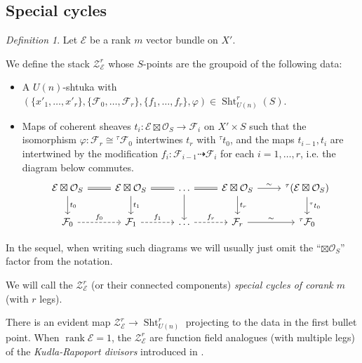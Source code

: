 \documentclass[reqno]{amsart}
\numberwithin{equation}{section}
\newcommand{\Cal}[1]{\mathcal{#1}}
\newcommand{\ft}{{}^{\tau}}
\newcommand{\co}{\colon}
\DeclareMathOperator{\rank}{rank}
\DeclareMathOperator{\Sht}{Sht}
\newcommand\cO{\mathcal{O}}
\theoremstyle{remark}
\newtheorem{defn}[thm]{Definition}
\numberwithin{equation}{section}
\begin{document}
\subsection{Special cycles}

\begin{defn}\label{def: Z} Let $\Cal{E}$ be a rank $m$ vector bundle on $X'$.

 We define the stack $\Cal{Z}_{\Cal{E}}^{r}$ whose $S$-points are the groupoid of the following data: 
 \begin{itemize}
 \item A $U(n)$-shtuka with $(\{x'_1, \ldots, x'_r\}, \{\Cal{F}_0, \ldots, \Cal{F}_r\}, \{f_1, \ldots, f_r\}, \varphi) \in  \Sht_{U(n)}^{r}(S)$.
 \item Maps of coherent sheaves  $t_i \co \Cal{E} \boxtimes \cO_{S} \rightarrow \Cal{F}_i$ on $X'\times S$ such that the isomorphism $\varphi \co \Cal{F}_r \cong \ft \Cal{F}_0$ intertwines $t_r$ with $\ft t_0$, and the maps $t_{i-1}, t_{i}$ are intertwined by the modification $f_i \co  \Cal{F}_{i-1} \dashrightarrow \Cal{F}_{i}$ for each $i = 1, \ldots, r$, i.e. the diagram below commutes. 
\[
\begin{tikzcd}
\Cal{E}\boxtimes\cO_{S} \ar[d, "t_0"] \ar[r, equals] &  \Cal{E}\boxtimes\cO_{S} \ar[r, equals]  \ar[d, "t_1"]& \ldots \ar[d] \ar[r, equals] & \Cal{E}\boxtimes\cO_{S} \ar[r, "\sim"] \ar[d, "t_{r}"] & \ft (\Cal{E} \boxtimes\cO_{S})\ar[d, "\ft t_0"] \\
\Cal{F}_0 \ar[r, dashed, "f_0"] & \Cal{F}_1 \ar[r, dashed, "f_1"]  &  \ldots \ar[r, dashed, "f_r"] &  \Cal{F}_{r} \ar[r, "\sim"] & \ft \Cal{F}_0  
\end{tikzcd}
\]
\end{itemize}
In the sequel, when writing such diagrams we will usually just omit the ``$\boxtimes \cO_S$'' factor from the notation.


We will call the $\Cal{Z}_{\Cal{E}}^r$ (or their connected components) {\em special cycles of corank $m$} (with $r$ legs).
\end{defn}


There is an evident map $\Cal{Z}_{\Cal{E}}^{r} \rightarrow \Sht_{U(n)}^r$ projecting to the data in the first bullet point. When $\rank \Cal{E}=1$, the $\Cal{Z}_{\Cal{E}}^{r} $ are function field analogues (with multiple legs) of the \emph{Kudla-Rapoport divisors} introduced in \cite{KRI, KRII}. %
\end{document}
